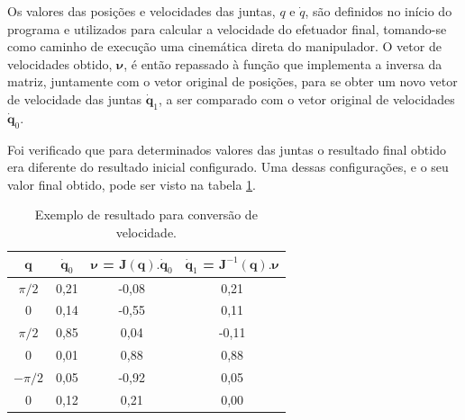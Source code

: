 Os valores das posições e velocidades das juntas, $q$ e $\dot{q}$, são definidos no início do programa
e utilizados para calcular a velocidade do efetuador final, tomando-se como caminho de execução uma 
cinemática direta do manipulador. O vetor de velocidades obtido, $\boldsymbol{\nu}$, é então repassado à função
que implementa a inversa da matriz, juntamente com o vetor original de posições, para se obter um 
novo vetor de velocidade das juntas $\dot{\textbf{q}}_1$, a ser comparado com o vetor original de velocidades $\dot{\textbf{q}}_0$.

Foi verificado que para determinados valores das juntas o resultado final obtido era diferente do resultado
inicial configurado. Uma dessas configurações, e o seu valor final obtido, pode ser visto na tabela 
\ref{tab:res-jacobiana}.

\begin{table}[ht]
    \begin{centering}    
    
    \caption{Exemplo de resultado para conversão de velocidade.}
    
    \begin{tabular}{|c|c|c|c|}
        \hline
        $\textbf{q}$ & $\dot{\textbf{q}}_0$ & $\boldsymbol{\nu}$ = $\textbf{J}(\textbf{q}).\dot{\textbf{q}}_0$ & $\dot{\textbf{q}}_1$ = $\textbf{J}^{-1}(\textbf{q}).\boldsymbol{\nu}$ \tabularnewline
        \hline
        \hline
        $\pi/2$ & 0,21 & -0,08 & 0,21  \tabularnewline
        \hline
        $0$ & 0,14 & -0,55 & 0,11 \tabularnewline
        \hline
        $\pi/2$ & 0,85 & 0,04 & -0,11 \tabularnewline
        \hline
        $0$ & 0,01 & 0,88 & 0,88 \tabularnewline
        \hline
        $-\pi/2$ & 0,05 & -0,92 & 0,05  \tabularnewline
        \hline
        $0$ & 0,12 & 0,21 & 0,00 \tabularnewline
        \hline
    \end{tabular}

\label{tab:res-jacobiana}
    
\par\end{centering}
\end{table}

